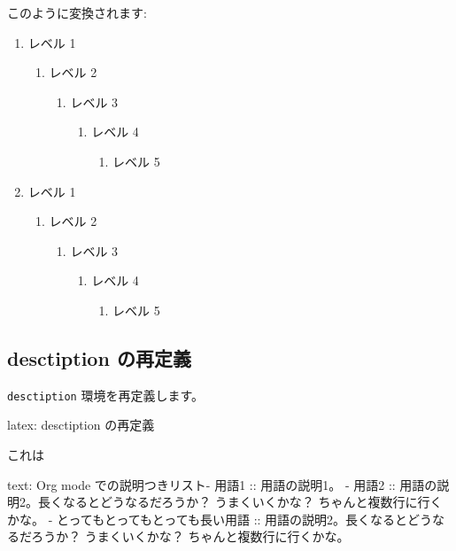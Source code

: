 \documentclass[dvipdfmx,a4j,14pt,uplatex,openany]{jsbook}
\begin{document}
このように変換されます:


\begin{enumerate}
\item レベル 1
\begin{enumerate}
\item レベル 2
\begin{enumerate}
\item レベル 3
\begin{enumerate}
\item レベル 4
\begin{enumerate}
\item レベル 5
\end{enumerate}
\end{enumerate}
\end{enumerate}
\end{enumerate}
\item レベル 1
\begin{enumerate}
\item レベル 2
\begin{enumerate}
\item レベル 3
\begin{enumerate}
\item レベル 4
\begin{enumerate}
\item レベル 5
\end{enumerate}
\end{enumerate}
\end{enumerate}
\end{enumerate}
\end{enumerate}

\subsection{desctiption の再定義}
\label{sec:orge9f0540}
\texttt{desctiption} 環境を再定義します。

\begin{programlist}[label={orgcd9f0fa}]{latex}{: desctiption の再定義}
\end{programlist}
これは

\begin{programlist}[label={orga079881}]{text}{: Org mode での説明つきリスト}- 用語1 :: 用語の説明1。
- 用語2 :: 用語の説明2。長くなるとどうなるだろうか？ うまくいくかな？
         ちゃんと複数行に行くかな。
- とってもとってもとっても長い用語 :: 
     用語の説明2。長くなるとどうなるだろうか？ うまくいくかな？
     ちゃんと複数行に行くかな。
\end{programlist}
\end{document}
